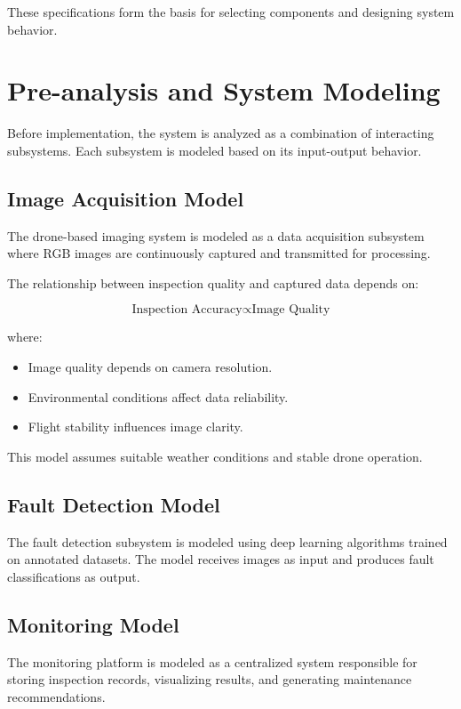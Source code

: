 These specifications form the basis for selecting components and designing system behavior.

\section{Pre-analysis and System Modeling}

Before implementation, the system is analyzed as a combination of interacting subsystems. Each subsystem is modeled based on its input-output behavior.

\subsection{Image Acquisition Model}

The drone-based imaging system is modeled as a data acquisition subsystem where RGB images are continuously captured and transmitted for processing.

The relationship between inspection quality and captured data depends on:

\[
\text{Inspection Accuracy} \propto \text{Image Quality}
\]

where:

\begin{itemize}
\item Image quality depends on camera resolution.
\item Environmental conditions affect data reliability.
\item Flight stability influences image clarity.
\end{itemize}

This model assumes suitable weather conditions and stable drone operation.

\subsection{Fault Detection Model}

The fault detection subsystem is modeled using deep learning algorithms trained on annotated datasets. The model receives images as input and produces fault classifications as output.

\subsection{Monitoring Model}

The monitoring platform is modeled as a centralized system responsible for storing inspection records, visualizing results, and generating maintenance recommendations.

